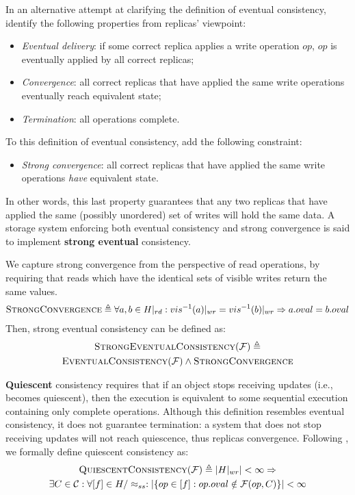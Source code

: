 \documentclass[letter, 11pt]{article}
\newcommand{\citeN}{\citet}
\renewcommand{\cite}{\citep}
\begin{document}
In an alternative attempt at clarifying the definition of eventual consistency, 
\citeN{Shapiro.ea:11} identify the following properties from replicas' viewpoint:
\begin{itemize}
\item \emph{Eventual delivery}: if some correct replica applies a write operation $op$, $op$ is eventually applied by all correct replicas;
\item \emph{Convergence}:
all correct replicas that have applied the same write operations eventually reach equivalent state;
\item \emph{Termination}: 
all operations complete. \end{itemize}
To this definition of eventual consistency, \citeN{Shapiro.ea:11} add the following constraint:
\begin{itemize}
\item \emph{Strong convergence}:
all correct replicas that have applied the same write operations \emph{have} equivalent state.
\end{itemize}
In other words, this last property guarantees that any two replicas that have applied the same (possibly unordered) set of writes will hold the same data. A storage system enforcing both eventual consistency and strong convergence is said to implement \textbf{strong eventual} consistency.

We capture strong convergence from the perspective of read operations, by requiring that reads which have the identical sets of visible writes return the same values. 
\begin{multline}
\label{eq:strongcon}
\textsc{StrongConvergence} \triangleq \forall a,b\in H|_{rd}: vis^{-1}(a)|_{wr}=vis^{-1}(b)|_{wr} \Rightarrow a.oval = b.oval
\end{multline}
Then, strong eventual consistency can be defined as:
\begin{multline}
\textsc{StrongEventualConsistency}(\mathcal{F}) \triangleq \\ \textsc{EventualConsistency}(\mathcal{F}) \wedge \textsc{StrongConvergence} 
\end{multline}


\textbf{Quiescent} consistency \cite{Herlihy.Shavit:08} requires that 
if an object stops receiving updates (i.e., becomes quiescent), 
then the execution is equivalent to some sequential execution containing only complete operations.
Although this definition resembles eventual consistency, 
it does not guarantee termination: 
a system that does not stop receiving updates will not reach quiescence, thus replicas convergence.
Following \cite{Burckhardt:14}, we formally define quiescent consistency as:
\begin{multline}
\textsc{QuiescentConsistency}(\mathcal{F}) \triangleq 
|H|_{wr}| < \infty \Rightarrow \\
\exists C \in \mathcal{C} : \forall[f] \in H/\approx_{ss} : |\{op \in [f]: op.oval \notin \mathcal{F}(op,C) \}| < \infty
\end{multline}
\end{document}
